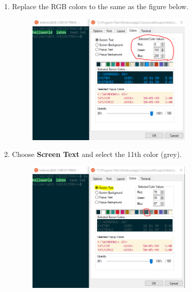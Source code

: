 \begin{enumerate}[a)]
\begin{enumerate}[1.]
        \item Replace the RGB colors to the same as the figure below.
        \begin{figure}[H]
            \centering
            \includegraphics[width=0.75\textwidth]{tex/WSL/Ubuntu_terminal_colors/Figures/12.PNG}
        \end{figure}
        
        \item Choose \textbf{Screen Text} and select the 11th color (grey).
        \begin{figure}[H]
            \centering
            \includegraphics[width=0.75\textwidth]{tex/WSL/Ubuntu_terminal_colors/Figures/11.PNG}
        \end{figure}
        

\end{enumerate}
\end{enumerate}

